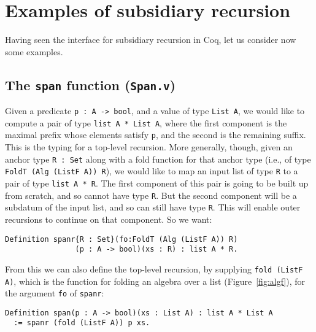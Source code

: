 \documentclass[a4paper,USenglish]{lipics-v2021}
\begin{document}
\section{Examples of subsidiary recursion}
\label{sec:examples}

Having seen the interface for subsidiary recursion in Coq, let us
consider now some examples.

\subsection{The \texttt{span} function (\texttt{Span.v})}

Given a predicate \verb|p : A -> bool|, and a value of type
\verb|List A|, we would like to compute a pair of type
\verb|list A * List A|, where the first component is the maximal
prefix whose elements satisfy \verb|p|, and the second is the
remaining suffix.  This is the typing for a top-level recursion.  More
generally, though, given an anchor type \verb|R : Set| along with a
fold function for that anchor type (i.e., of type \verb|FoldT (Alg (ListF A)) R|),
we would like to map an input list of type \verb|R| to a pair of
type \verb|list A * R|.  The first component of this pair is
going to be built up from scratch, and so cannot have type \verb|R|.
But the second component will be a subdatum of the input list,
and so can still have type \verb|R|.  This will enable outer recursions
to continue on that component.  So we want: 
\begin{verbatim}
Definition spanr{R : Set}(fo:FoldT (Alg (ListF A)) R)
                (p : A -> bool)(xs : R) : list A * R.
\end{verbatim}
\noindent From this we can also define the top-level recursion, by
supplying \verb|fold (ListF A)|, which is the function for folding an algebra
over a list (Figure~\ref{fig:algf}), for the argument \verb|fo| of \verb|spanr|:
\begin{verbatim}
Definition span(p : A -> bool)(xs : List A) : list A * List A
  := spanr (fold (ListF A)) p xs.
\end{verbatim} 
\end{document}
